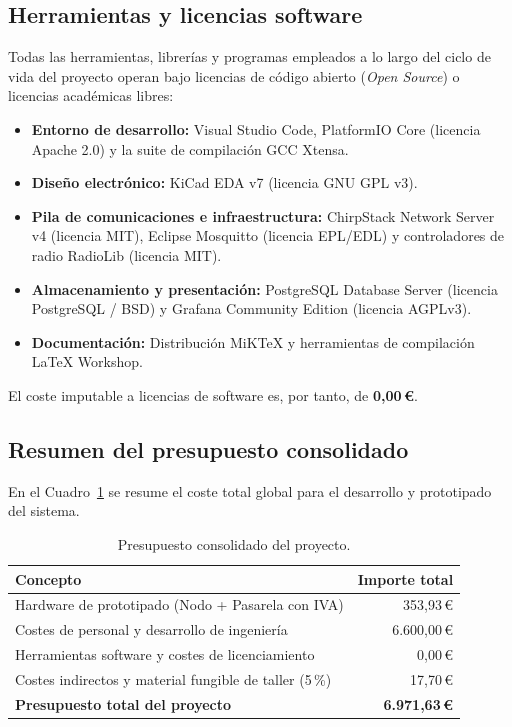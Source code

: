 \subsection{Herramientas y licencias software}
Todas las herramientas, librerías y programas empleados a lo largo del ciclo de vida del proyecto operan bajo licencias de código abierto (\textit{Open Source}) o licencias académicas libres:
\begin{itemize}
    \item \textbf{Entorno de desarrollo:} Visual Studio Code, PlatformIO Core (licencia Apache 2.0) y la suite de compilación GCC Xtensa.
    \item \textbf{Diseño electrónico:} KiCad EDA v7 (licencia GNU GPL v3).
    \item \textbf{Pila de comunicaciones e infraestructura:} ChirpStack Network Server v4 (licencia MIT), Eclipse Mosquitto (licencia EPL/EDL) y controladores de radio RadioLib (licencia MIT).
    \item \textbf{Almacenamiento y presentación:} PostgreSQL Database Server (licencia PostgreSQL / BSD) y Grafana Community Edition (licencia AGPLv3).
    \item \textbf{Documentación:} Distribución MiKTeX y herramientas de compilación LaTeX Workshop.
\end{itemize}
El coste imputable a licencias de software es, por tanto, de \textbf{0,00\,€}.

\subsection{Resumen del presupuesto consolidado}
En el Cuadro~\ref{tab:presupuesto_consolidado} se resume el coste total global para el desarrollo y prototipado del sistema.

\begin{table}[htbp]
\centering
\begin{tabular}{p{8cm} r}
\hline
\textbf{Concepto} & \textbf{Importe total} \\ \hline
Hardware de prototipado (Nodo + Pasarela con IVA) & 353,93\,€ \\
Costes de personal y desarrollo de ingeniería & 6.600,00\,€ \\
Herramientas software y costes de licenciamiento & 0,00\,€ \\
Costes indirectos y material fungible de taller (5\,\%) & 17,70\,€ \\ \hline
\textbf{Presupuesto total del proyecto} & \textbf{6.971,63\,€} \\ \hline
\end{tabular}
\caption{Presupuesto consolidado del proyecto.}
\label{tab:presupuesto_consolidado}
\end{table}


